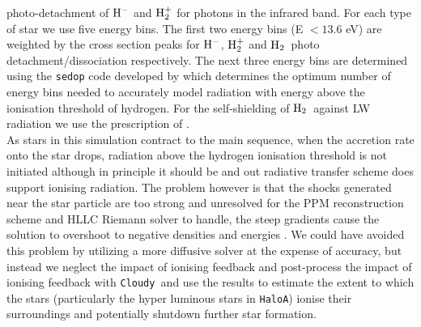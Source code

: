 \documentclass[graphics, twocolumn, usenatbib]{mn2e}
\newcommand{\cloudy}{\texttt{Cloudy~}}
\newcommand{\molH} {$\rm{H_2}$~}
\newcommand{\hac} {\texttt{HaloA}}
\begin{document}
photo-detachment of  $\rm{H^-}$ and $\rm{H_2^+}$ for photons in the infrared band. For each type of
star we use five energy bins. The first two energy bins (E $< 13.6$ eV) are weighted by the cross
section peaks for $\rm{H^-}$,  $\rm{H_2^+}$ and \molH photo detachment/dissociation respectively.
The next three energy bins are determined using the \texttt{sedop} code developed by
\cite{Mirocha_2012} which determines the optimum number of energy bins needed to
accurately model radiation with energy above the ionisation threshold of hydrogen. For the
self-shielding of \molH against LW radiation we use the prescription of \cite{Wolcott-Green_2011}.\\
\indent As stars in this simulation contract to the main sequence, when the accretion rate onto the
star drops, radiation above the hydrogen ionisation threshold is not initiated although in
principle it should be and out radiative transfer scheme does support ionising radiation. The
problem however is that the shocks generated near
the star particle are too strong and unresolved for the PPM reconstruction scheme and HLLC Riemann
solver to handle, the steep gradients cause the solution to overshoot to negative densities and
energies \citep[see][for details]{Enzo_2014}. We could have avoided this problem by utilizing a more
diffusive solver at the expense of accuracy, but instead
we neglect the impact of ionising feedback and post-process the impact of
ionising feedback with \cloudy and use the results to estimate the extent to which the stars
(particularly the hyper luminous stars in \hac) ionise their surroundings and potentially shutdown
further star formation.
 
\end{document}
